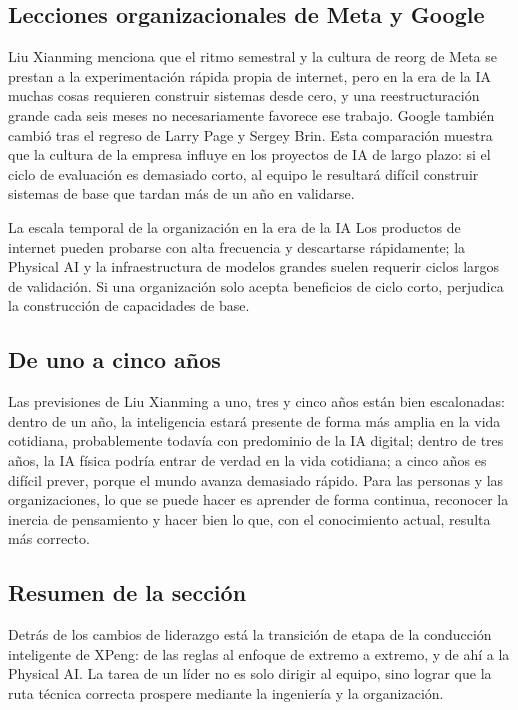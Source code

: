 \documentclass[a4paper]{article}
\begin{document}
\subsection{Lecciones organizacionales de Meta y Google}

Liu Xianming menciona que el ritmo semestral y la cultura de reorg de Meta se prestan a la experimentación rápida propia de internet, pero en la era de la IA muchas cosas requieren construir sistemas desde cero, y una reestructuración grande cada seis meses no necesariamente favorece ese trabajo. Google también cambió tras el regreso de Larry Page y Sergey Brin. Esta comparación muestra que la cultura de la empresa influye en los proyectos de IA de largo plazo: si el ciclo de evaluación es demasiado corto, al equipo le resultará difícil construir sistemas de base que tardan más de un año en validarse.

\begin{knowledgebox}{La escala temporal de la organización en la era de la IA}
Los productos de internet pueden probarse con alta frecuencia y descartarse rápidamente; la Physical AI y la infraestructura de modelos grandes suelen requerir ciclos largos de validación. Si una organización solo acepta beneficios de ciclo corto, perjudica la construcción de capacidades de base.
\end{knowledgebox}

\subsection{De uno a cinco años}

Las previsiones de Liu Xianming a uno, tres y cinco años están bien escalonadas: dentro de un año, la inteligencia estará presente de forma más amplia en la vida cotidiana, probablemente todavía con predominio de la IA digital; dentro de tres años, la IA física podría entrar de verdad en la vida cotidiana; a cinco años es difícil prever, porque el mundo avanza demasiado rápido. Para las personas y las organizaciones, lo que se puede hacer es aprender de forma continua, reconocer la inercia de pensamiento y hacer bien lo que, con el conocimiento actual, resulta más correcto.

\subsection{Resumen de la sección}

Detrás de los cambios de liderazgo está la transición de etapa de la conducción inteligente de XPeng: de las reglas al enfoque de extremo a extremo, y de ahí a la Physical AI. La tarea de un líder no es solo dirigir al equipo, sino lograr que la ruta técnica correcta prospere mediante la ingeniería y la organización.
\end{document}
